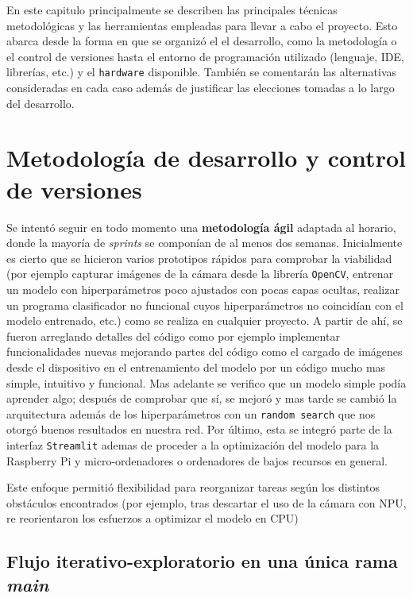 
En este capitulo principalmente se describen las principales técnicas metodológicas y las herramientas empleadas para llevar a cabo el proyecto. Esto abarca desde la forma en que se organizó el el desarrollo, como la metodología o el control de versiones hasta el entorno de programación utilizado (lenguaje, IDE, librerías, etc.) y el \texttt{hardware} disponible. También se comentarán las alternativas consideradas en cada caso además de justificar las elecciones tomadas a lo largo del desarrollo.


\section{Metodología de desarrollo y control de versiones}\label{metodologia-de-desarrollo-y-control-de-versiones}
Se intentó seguir en todo momento una \textbf{metodología ágil} adaptada al horario, donde la mayoría de \textit{sprints} se componían de al menos dos semanas. Inicialmente es cierto que se hicieron varios prototipos rápidos para comprobar la viabilidad (por ejemplo capturar imágenes de la cámara desde la librería \texttt{OpenCV}, entrenar un modelo con hiperparámetros poco ajustados con pocas capas ocultas, realizar un programa clasificador no funcional cuyos hiperparámetros no coincidían con el modelo entrenado, etc.) como se realiza en cualquier proyecto. A partir de ahí, se fueron arreglando detalles del código como por ejemplo implementar funcionalidades nuevas mejorando partes del código como el cargado de imágenes desde el dispositivo en el entrenamiento del modelo por un código mucho mas simple, intuitivo y funcional. Mas adelante se verifico que un modelo simple podía aprender algo; después de comprobar que sí, se mejoró y mas tarde se cambió la arquitectura además de los hiperparámetros con un \texttt{random search} que nos otorgó buenos resultados en nuestra red. Por último, esta se integró parte de la interfaz \texttt{Streamlit} ademas de proceder a la optimización del modelo para la Raspberry Pi y micro-ordenadores o ordenadores de bajos recursos en general. 

Este enfoque permitió flexibilidad para reorganizar tareas según los distintos obstáculos encontrados (por ejemplo, tras descartar el uso de la cámara con NPU, re reorientaron los esfuerzos a optimizar el modelo en CPU)

\subsection{Flujo iterativo-exploratorio en una única rama \textit{main}}\label{flujo-iterativo-exploratorio-en-una-única-rama-main}

